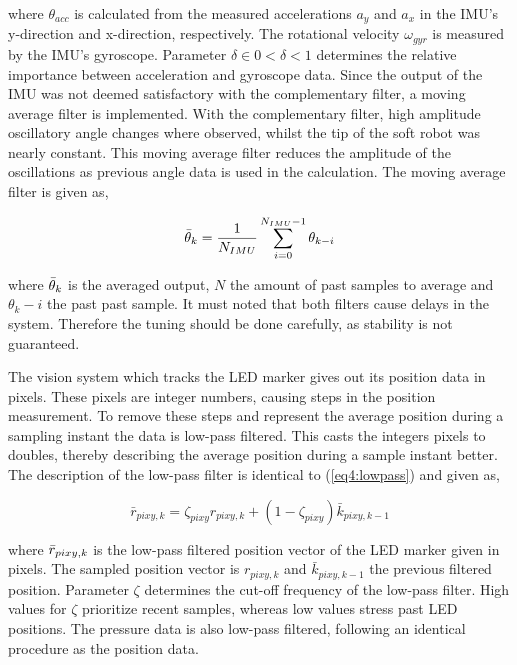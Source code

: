 where $\theta_{acc}$ is calculated from the measured accelerations $a_y$ and $a_x$ in the IMU's y-direction and x-direction, respectively. The rotational velocity $\omega_{gyr}$ is measured by the IMU's gyroscope. Parameter $\delta \in 0 < \delta < 1$ determines the relative importance between acceleration and gyroscope data. Since the output of the IMU was not deemed satisfactory with the complementary filter, a moving average filter is implemented. With the complementary filter, high amplitude oscillatory angle changes where observed, whilst the tip of the soft robot was nearly constant. This moving average filter reduces the amplitude of the oscillations as previous angle data is used in the calculation. The moving average filter is given as,

\begin{equation}
    \Bar{\theta}_k = \frac{1}{N_{IMU}}\sum_{i = 0} ^ {N_{IMU}-1} \theta_{k-i}
\end{equation}

where $\Bar{\theta}_k$ is the averaged output, $N$ the amount of past samples to average and $\theta_k-i$ the past past sample. It must noted that both filters cause delays in the system. Therefore the tuning should be done carefully, as stability is not guaranteed.

The vision system which tracks the LED marker gives out its position data in pixels. These pixels are integer numbers, causing steps in the position measurement. To remove these steps and represent the average position during a sampling instant the data is low-pass filtered. This casts the integers pixels to doubles, thereby describing the average position during a sample instant better. The description of the low-pass filter is identical to (\ref{eq4:lowpass}) and given as,

\begin{equation}
\bar{r}_{pixy,k} = \zeta_{pixy} r_{pixy,k} + (1-\zeta_{pixy})\bar{k}_{pixy,k-1}
\label{eq5:lowpass}
\end{equation}

where $\Bar{r}_{pixy,k}$ is the low-pass filtered position vector of the LED marker given in pixels. The sampled position vector is $r_{pixy,k}$ and $\bar{k}_{pixy,k-1}$ the previous filtered position. Parameter $\zeta$ determines the cut-off frequency of the low-pass filter. High values for $\zeta$ prioritize recent samples, whereas low values stress past LED positions. The pressure data is also low-pass filtered, following an identical procedure as the position data. 


